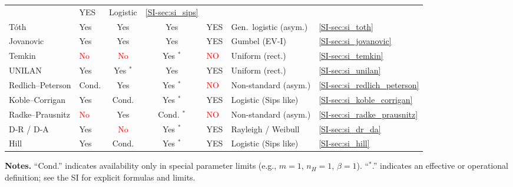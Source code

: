 \documentclass[journal=jacsat,manuscript=article]{achemso}
\begin{document}
\begin{table}[H]
\begin{tabular}{@{} p{2.0cm} p{1.0cm} c c p{3.0cm} p{3.8cm} p{1.8cm} @{}}
			& \textcolor{green!50!black}{YES}
			& Logistic
			& \ref{SI-sec:si_sips} \\
			T\'{o}th
			& \textcolor{green!50!black}{Yes} & \textcolor{green!50!black}{Yes} & \textcolor{green!50!black}{Yes}
			& \textcolor{green!50!black}{YES}
			& Gen.\ logistic (asym.)
			& \ref{SI-sec:si_toth} \\
			Jovanovic
			& \textcolor{green!50!black}{Yes} & \textcolor{green!50!black}{Yes} & \textcolor{green!50!black}{Yes}
			& \textcolor{green!50!black}{YES}
			& Gumbel (EV-I)
			& \ref{SI-sec:si_jovanovic} \\
			Temkin
			& \textcolor{red}{No} & \textcolor{red}{No} & \textcolor{green!50!black}{Yes} $^*$
			& \textcolor{red}{NO}
			& Uniform (rect.)
			& \ref{SI-sec:si_temkin} \\
			UNILAN
			& \textcolor{green!50!black}{Yes} & \textcolor{green!50!black}{Yes} $^*$ & \textcolor{green!50!black}{Yes}
			& \textcolor{green!50!black}{YES}
			& Uniform (rect.)
			& \ref{SI-sec:si_unilan} \\
			Redlich--Peterson
			& \textcolor{orange!80!black}{Cond.} & \textcolor{green!50!black}{Yes} & \textcolor{green!50!black}{Yes} $^*$
			& \textcolor{red}{NO}
			& Non-standard (asym.)
			& \ref{SI-sec:si_redlich_peterson} \\
			Koble--Corrigan
			& \textcolor{green!50!black}{Yes} & \textcolor{orange!80!black}{Cond.} & \textcolor{green!50!black}{Yes} $^*$
			& \textcolor{green!50!black}{YES}
			& Logistic (Sips  like)
			& \ref{SI-sec:si_koble_corrigan} \\
			Radke--Prausnitz
			& \textcolor{red}{No} & \textcolor{green!50!black}{Yes} & \textcolor{orange!80!black}{Cond.} $^*$
			& \textcolor{red}{NO}
			& Non-standard (asym.)
			& \ref{SI-sec:si_radke_prausnitz} \\
			D-R / D-A
			& \textcolor{green!50!black}{Yes} & \textcolor{red}{No} & \textcolor{green!50!black}{Yes} $^*$
			& \textcolor{green!50!black}{YES}
			& Rayleigh / Weibull
			& \ref{SI-sec:si_dr_da} \\
			Hill
			& \textcolor{green!50!black}{Yes} & \textcolor{orange!80!black}{Cond.} & \textcolor{green!50!black}{Yes} $^*$
			& \textcolor{green!50!black}{YES}
			& Logistic (Sips like)
			& \ref{SI-sec:si_hill} \\
			\hline
		\end{tabular}
	\end{table}

	\noindent\textbf{Notes.} ``Cond.'' indicates availability only in special parameter limits (e.g., $m=1$, $n_H=1$, $\beta=1$). ``$^*$.'' indicates an effective or operational definition; see the SI for explicit formulas and limits.
	
\end{document}
